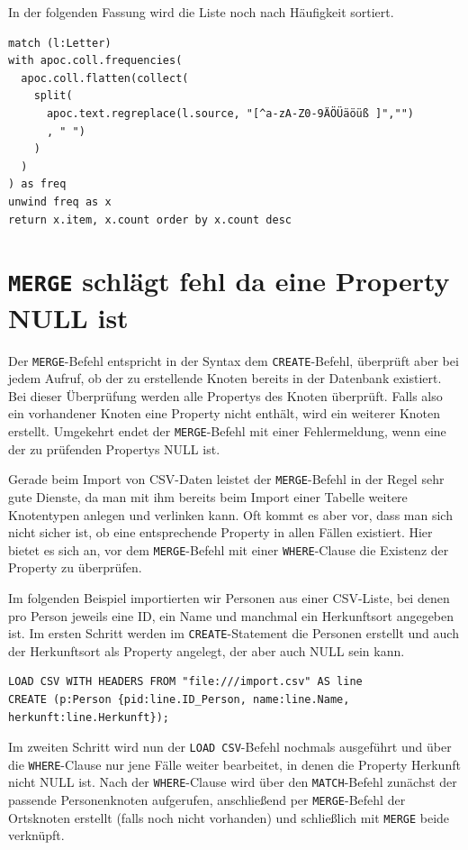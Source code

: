 \documentclass[ngerman,]{scrreprt}
\begin{document}
In der folgenden Fassung wird die Liste noch nach Häufigkeit sortiert.

\begin{verbatim}
match (l:Letter)
with apoc.coll.frequencies(
  apoc.coll.flatten(collect(
    split(
      apoc.text.regreplace(l.source, "[^a-zA-Z0-9ÄÖÜäöüß ]","")
      , " ")
    )
  )
) as freq
unwind freq as x
return x.item, x.count order by x.count desc
\end{verbatim}

\section{\texorpdfstring{\texttt{MERGE} schlägt fehl da eine Property NULL ist}{MERGE schlägt fehl da eine Property NULL ist}}\label{merge-schluxe4gt-fehl-da-eine-property-null-ist}

Der \texttt{MERGE}-Befehl entspricht in der Syntax dem \texttt{CREATE}-Befehl, überprüft aber bei jedem Aufruf, ob der zu erstellende Knoten bereits in der Datenbank existiert. Bei dieser Überprüfung werden alle Propertys des Knoten überprüft. Falls also ein vorhandener Knoten eine Property nicht enthält, wird ein weiterer Knoten erstellt. Umgekehrt endet der \texttt{MERGE}-Befehl mit einer Fehlermeldung, wenn eine der zu prüfenden Propertys NULL ist.

Gerade beim Import von CSV-Daten leistet der \texttt{MERGE}-Befehl in der Regel sehr gute Dienste, da man mit ihm bereits beim Import einer Tabelle weitere Knotentypen anlegen und verlinken kann. Oft kommt es aber vor, dass man sich nicht sicher ist, ob eine entsprechende Property in allen Fällen existiert. Hier bietet es sich an, vor dem \texttt{MERGE}-Befehl mit einer \texttt{WHERE}-Clause die Existenz der Property zu überprüfen.

Im folgenden Beispiel importierten wir Personen aus einer CSV-Liste, bei denen pro Person jeweils eine ID, ein Name und manchmal ein Herkunftsort angegeben ist. Im ersten Schritt werden im \texttt{CREATE}-Statement die Personen erstellt und auch der Herkunftsort als Property angelegt, der aber auch NULL sein kann.

\begin{verbatim}
LOAD CSV WITH HEADERS FROM "file:///import.csv" AS line
CREATE (p:Person {pid:line.ID_Person, name:line.Name, herkunft:line.Herkunft});
\end{verbatim}

Im zweiten Schritt wird nun der \texttt{LOAD\ CSV}-Befehl nochmals ausgeführt und über die \texttt{WHERE}-Clause nur jene Fälle weiter bearbeitet, in denen die Property Herkunft nicht NULL ist. Nach der \texttt{WHERE}-Clause wird über den \texttt{MATCH}-Befehl zunächst der passende Personenknoten aufgerufen, anschließend per \texttt{MERGE}-Befehl der Ortsknoten erstellt (falls noch nicht vorhanden) und schließlich mit \texttt{MERGE} beide verknüpft.
\end{document}
